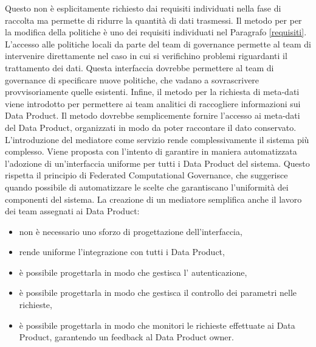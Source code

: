 \documentclass[12pt]{report}
\begin{document}
Questo non è esplicitamente richiesto dai requisiti individuati nella fase di raccolta ma permette di ridurre la quantità di dati trasmessi.
Il metodo per per la modifica della politiche è uno dei requisiti individuati nel Paragrafo \ref{requisiti}.
L'accesso alle politiche locali da parte del team di governance permette al team di intervenire direttamente nel caso in cui si verifichino problemi riguardanti il trattamento dei dati.
Questa interfaccia dovrebbe permettere al team di governance di specificare nuove politiche, che vadano a sovrascrivere provvisoriamente quelle esistenti.
Infine, il metodo per la richiesta di meta-dati viene introdotto per permettere ai team analitici di raccogliere informazioni sui Data Product.
Il metodo dovrebbe semplicemente fornire l'accesso ai meta-dati del Data Product, organizzati in modo da poter raccontare il dato conservato.
L'introduzione del mediatore come servizio rende complessivamente il sistema più complesso.
Viene proposta con l'intento di garantire in maniera automatizzata l'adozione di un'interfaccia uniforme per tutti i Data Product del sistema.
Questo rispetta il principio di Federated Computational Governance, che suggerisce quando possibile di automatizzare le scelte che garantiscano l'uniformità dei componenti del sistema.
La creazione di un mediatore semplifica anche il lavoro dei team assegnati ai Data Product:
\begin{itemize}
    \item non è necessario uno sforzo di progettazione dell'interfaccia, 
    \item rende uniforme l'integrazione con tutti i Data Product,
    \item è possibile progettarla in modo che gestisca l' autenticazione,
    \item è possibile progettarla in modo che gestisca il controllo dei parametri nelle richieste,
    \item è possibile progettarla in modo che monitori le richieste effettuate ai Data Product, garantendo un feedback al Data Product owner.
\end{itemize}
\end{document}
